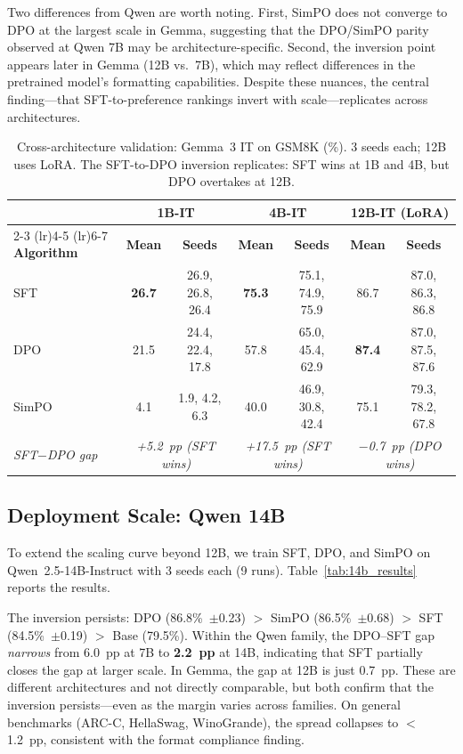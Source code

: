 \documentclass{article}
\begin{document}
Two differences from Qwen are worth noting. First, SimPO does not converge to DPO at the largest scale in Gemma, suggesting that the DPO/SimPO parity observed at Qwen 7B may be architecture-specific. Second, the inversion point appears later in Gemma (12B vs.\ 7B), which may reflect differences in the pretrained model's formatting capabilities. Despite these nuances, the central finding---that SFT-to-preference rankings invert with scale---replicates across architectures.

\begin{table}[t]
\centering
\caption{Cross-architecture validation: Gemma~3 IT on GSM8K (\%). 3 seeds each; 12B uses LoRA. The SFT-to-DPO inversion replicates: SFT wins at 1B and 4B, but DPO overtakes at 12B.}
\label{tab:gemma_results}
\small
\begin{tabular}{@{}lcccccc@{}}
\toprule
& \multicolumn{2}{c}{\textbf{1B-IT}} & \multicolumn{2}{c}{\textbf{4B-IT}} & \multicolumn{2}{c}{\textbf{12B-IT (LoRA)}} \\
\cmidrule(lr){2-3} \cmidrule(lr){4-5} \cmidrule(lr){6-7}
\textbf{Algorithm} & \textbf{Mean} & \textbf{Seeds} & \textbf{Mean} & \textbf{Seeds} & \textbf{Mean} & \textbf{Seeds} \\
\midrule
SFT & \textbf{26.7} & 26.9, 26.8, 26.4 & \textbf{75.3} & 75.1, 74.9, 75.9 & 86.7 & 87.0, 86.3, 86.8 \\
DPO & 21.5 & 24.4, 22.4, 17.8 & 57.8 & 65.0, 45.4, 62.9 & \textbf{87.4} & 87.0, 87.5, 87.6 \\
SimPO & 4.1 & 1.9, 4.2, 6.3 & 40.0 & 46.9, 30.8, 42.4 & 75.1 & 79.3, 78.2, 67.8 \\
\midrule
\textit{SFT$-$DPO gap} & \multicolumn{2}{c}{\textit{+5.2~pp (SFT wins)}} & \multicolumn{2}{c}{\textit{+17.5~pp (SFT wins)}} & \multicolumn{2}{c}{\textit{$-$0.7~pp (DPO wins)}} \\
\bottomrule
\end{tabular}
\end{table}

\subsection{Deployment Scale: Qwen 14B}
\label{sec:14b_results}

To extend the scaling curve beyond 12B, we train SFT, DPO, and SimPO on Qwen~2.5-14B-Instruct with 3 seeds each (9 runs). Table~\ref{tab:14b_results} reports the results.

The inversion persists: DPO (86.8\%~$\pm$0.23) $>$ SimPO (86.5\%~$\pm$0.68) $>$ SFT (84.5\%~$\pm$0.19) $>$ Base (79.5\%). Within the Qwen family, the DPO--SFT gap \emph{narrows} from 6.0~pp at 7B to \textbf{2.2~pp} at 14B, indicating that SFT partially closes the gap at larger scale. In Gemma, the gap at 12B is just 0.7~pp. These are different architectures and not directly comparable, but both confirm that the inversion persists---even as the margin varies across families. On general benchmarks (ARC-C, HellaSwag, WinoGrande), the spread collapses to $<$1.2~pp, consistent with the format compliance finding.
\end{document}
